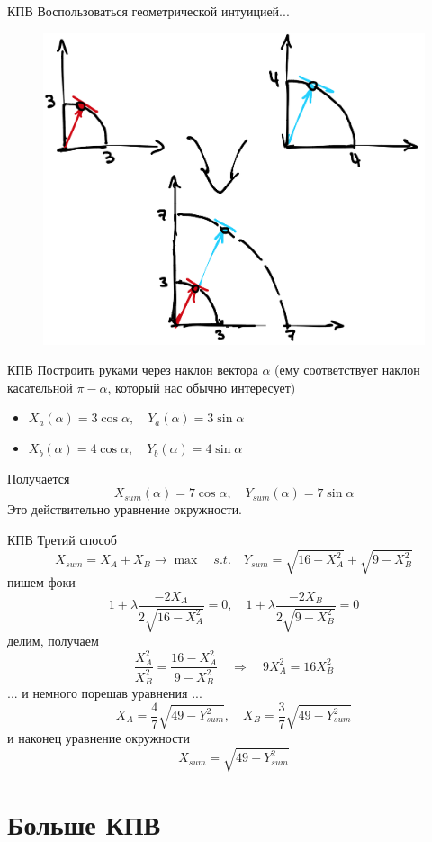 \documentclass{beamer}
\begin{document}
\begin{frame}{КПВ}
Воспользоваться геометрической интуицией...
\begin{figure}[hbt]
\centering
\includegraphics[width=.75 \textwidth]{pic5.png}
\end{figure}
\end{frame}

\begin{frame}{КПВ}
Построить руками через наклон вектора $\alpha$ (ему соответствует наклон касательной $\pi - \alpha$, который нас обычно интересует)
\begin{itemize}
  \item $X_a(\alpha) = 3 \cos \alpha, \quad Y_a(\alpha) = 3 \sin \alpha$
  \item $X_b(\alpha) = 4 \cos \alpha, \quad Y_b(\alpha) = 4 \sin \alpha$
\end{itemize}
Получается
$$ X_{sum}(\alpha) = 7 \cos \alpha, \quad Y_{sum}(\alpha) = 7 \sin \alpha$$
Это действительно уравнение окружности.
\end{frame}

\begin{frame}{КПВ}
Третий способ
$$ X_{sum} = X_A + X_B \to \max \quad s.t. \quad Y_{sum} = \sqrt{16-X_A^2} + \sqrt{9-X_B^2}$$
пишем фоки
$$ 1 + \lambda \frac{-2X_A}{2 \sqrt{16- X_A^2}} = 0, \quad 1 + \lambda \frac{-2X_B}{2 \sqrt{9- X_B^2}} = 0$$
делим, получаем
$$ \frac{X^2_A}{X^2_B} = \frac{16-X_A^2}{9-X_B^2} \quad \Rightarrow \quad 9 X_A^2 = 16 X_B^2$$
... и немного порешав уравнения ...
$$ X_A = \frac{4}{7} \sqrt{49-Y^2_{sum}}, \quad X_B = \frac{3}{7} \sqrt{49-Y^2_{sum}}$$ и наконец уравнение окружности $$X_{sum} = \sqrt{49-Y^2_{sum}}$$
\end{frame}

\section{Больше КПВ}
\end{document}
